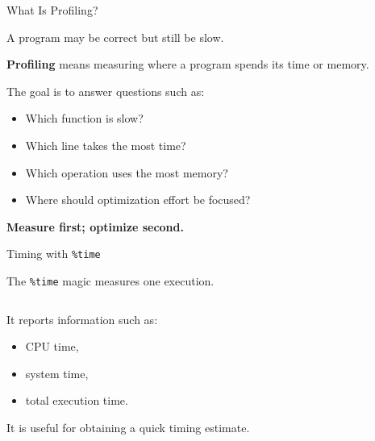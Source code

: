 \documentclass[aspectratio=43,10pt]{beamer}
\begin{document}
\begin{frame}{What Is Profiling?}

A program may be correct but still be slow.

\vspace{0.3cm}

\textbf{Profiling} means measuring where a program spends its time or memory.

\vspace{0.3cm}

The goal is to answer questions such as:

\begin{itemize}
  \item Which function is slow?
  \item Which line takes the most time?
  \item Which operation uses the most memory?
  \item Where should optimization effort be focused?
\end{itemize}

\vspace{0.3cm}

\textbf{Measure first; optimize second.}

\end{frame}

\begin{frame}[fragile]{Timing with \texttt{\%time}}

The \texttt{\%time} magic measures one execution.

\begin{lstlisting}[language=Python]
%time sum(range(1000000))
\end{lstlisting}

It reports information such as:

\begin{itemize}
  \item CPU time,
  \item system time,
  \item total execution time.
\end{itemize}

\vspace{0.3cm}

It is useful for obtaining a quick timing estimate.

\end{frame}
\end{document}
